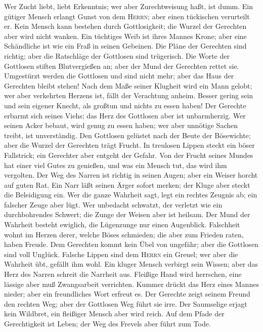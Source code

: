  Wer Zucht liebt, liebt Erkenntnis; wer aber
Zurechtweisung haßt, ist dumm.  Ein gütiger Mensch erlangt
Gunst von dem \textsc{Herrn}; aber einen tückischen verurteilt er.
 Kein Mensch kann bestehen durch Gottlosigkeit; die Wurzel
der Gerechten aber wird nicht wanken.  Ein tüchtiges Weib
ist ihres Mannes Krone; aber eine Schändliche ist wie ein Fraß in seinen
Gebeinen.  Die Pläne der Gerechten sind richtig; aber die
Ratschläge der Gottlosen sind trügerisch.  Die Worte der
Gottlosen stiften Blutvergießen an; aber der Mund der Gerechten rettet
sie.  Umgestürzt werden die Gottlosen und sind nicht mehr;
aber das Haus der Gerechten bleibt stehen!  Nach dem Maße
seiner Klugheit wird ein Mann gelobt; wer aber verkehrten Herzens ist,
fällt der Verachtung anheim.  Besser gering sein und sein
eigener Knecht, als großtun und nichts zu essen haben! 
Der Gerechte erbarmt sich seines Viehs; das Herz des Gottlosen aber ist
unbarmherzig.  Wer seinen Acker bebaut, wird genug zu
essen haben; wer aber unnötige Sachen treibt, ist unverständig.
 Den Gottlosen gelüstet nach der Beute der Bösewichte;
aber die Wurzel der Gerechten trägt Frucht.  In treulosen
Lippen steckt ein böser Fallstrick; ein Gerechter aber entgeht der
Gefahr.  Von der Frucht seines Mundes hat einer viel
Gutes zu genießen, und was ein Mensch tut, das wird ihm vergolten.
 Der Weg des Narren ist richtig in seinen Augen; aber ein
Weiser horcht auf guten Rat.  Ein Narr läßt seinen Ärger
sofort merken; der Kluge aber steckt die Beleidigung ein.
 Wer die ganze Wahrheit sagt, legt ein rechtes Zeugnis
ab; ein falscher Zeuge aber lügt.  Wer unbedacht
schwatzt, der verletzt wie ein durchbohrendes Schwert; die Zunge der
Weisen aber ist heilsam.  Der Mund der Wahrheit besteht
ewiglich, die Lügenzunge nur einen Augenblick. 
Falschheit wohnt im Herzen derer, welche Böses schmieden; die aber zum
Frieden raten, haben Freude.  Dem Gerechten kommt kein
Übel von ungefähr; aber die Gottlosen sind voll Unglück. 
Falsche Lippen sind dem \textsc{Herrn} ein Greuel; wer aber die Wahrheit
übt, gefällt ihm wohl.  Ein kluger Mensch verbirgt sein
Wissen; aber das Herz des Narren schreit die Narrheit aus.
 Fleißige Hand wird herrschen, eine lässige aber muß
Zwangsarbeit verrichten.  Kummer drückt das Herz eines
Mannes nieder; aber ein freundliches Wort erfreut es. 
Der Gerechte zeigt seinem Freund den rechten Weg; aber der Gottlosen Weg
führt sie irre.  Der Saumselige erjagt kein Wildbret, ein
fleißiger Mensch aber wird reich.  Auf dem Pfade der
Gerechtigkeit ist Leben; der Weg des Frevels aber führt zum Tode.

